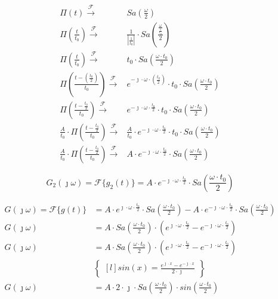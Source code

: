 \begin{task}
\begin{align*}
\Pi(t) \xrightarrow{\mathcal F} & Sa\left(\frac{\omega}{2}\right)\\
\Pi(\frac{t}{t_{0}}) \xrightarrow{\mathcal F} & \frac{1}{\left|\frac{1}{t_{0}}\right|} \cdot Sa\left(\frac{ \frac{\omega}{ \frac{1}{t_{0}} }}{2}\right)\\
\Pi(\frac{t}{t_{0}}) \xrightarrow{\mathcal F} & t_{0} \cdot Sa\left(\frac{\omega \cdot t_{0}}{2}\right)\\
\Pi(\frac{t-(\frac{t_{0}}{2})}{t_{0}}) \xrightarrow{\mathcal F} & e^{-\jmath \cdot \omega \cdot (\frac{t_{0}}{2})} \cdot t_{0} \cdot Sa\left(\frac{\omega \cdot t_{0}}{2}\right)\\
\Pi(\frac{t-\frac{t_{0}}{2}}{t_{0}}) \xrightarrow{\mathcal F} & e^{-\jmath \cdot \omega \cdot \frac{t_{0}}{2}} \cdot t_{0} \cdot Sa\left(\frac{\omega \cdot t_{0}}{2}\right)\\
\frac{A}{t_{0}} \cdot \Pi(\frac{t-\frac{t_{0}}{2}}{t_{0}}) \xrightarrow{\mathcal F} & \frac{A}{t_{0}} \cdot e^{-\jmath \cdot \omega \cdot \frac{t_{0}}{2}} \cdot t_{0} \cdot Sa\left(\frac{\omega \cdot t_{0}}{2}\right)\\
\frac{A}{t_{0}} \cdot \Pi(\frac{t-\frac{t_{0}}{2}}{t_{0}}) \xrightarrow{\mathcal F} & A \cdot e^{-\jmath \cdot \omega \cdot \frac{t_{0}}{2}} \cdot Sa\left(\frac{\omega \cdot t_{0}}{2}\right)
\end{align*}

\begin{equation}
G_{2}(\jmath \omega) = \mathcal F\{g_{2}(t)\} = A \cdot e^{-\jmath \cdot \omega \cdot \frac{t_{0}}{2}} \cdot Sa\left(\frac{\omega \cdot t_{0}}{2}\right)
\end{equation}

\begin{align*}
G(\jmath \omega) = \mathcal F\{g(t)\} &= A \cdot e^{\jmath \cdot \omega \cdot \frac{t_{0}}{2}} \cdot Sa\left(\frac{\omega \cdot t_{0}}{2}\right) - A \cdot  e^{-\jmath \cdot \omega \cdot \frac{t_{0}}{2}} \cdot Sa\left(\frac{\omega \cdot t_{0}}{2}\right)\\
G(\jmath \omega) &= A \cdot Sa\left(\frac{\omega \cdot t_{0}}{2}\right) \cdot \left(e^{\jmath \cdot \omega \cdot \frac{t_{0}}{2}} - e^{-\jmath \cdot \omega \cdot \frac{t_{0}}{2}}\right)\\
G(\jmath \omega) &= A \cdot Sa\left(\frac{\omega \cdot t_{0}}{2}\right) \cdot \left(e^{\jmath \cdot \omega \cdot \frac{t_{0}}{2}} - e^{-\jmath \cdot \omega \cdot \frac{t_{0}}{2}}\right)\\
&\begin{Bmatrix*}[l]
sin(x)=\frac{e^{\jmath \cdot x} - e^{-\jmath \cdot x}}{2 \cdot \jmath}
\end{Bmatrix*}\\
G(\jmath \omega) &= A \cdot 2 \cdot \jmath \cdot Sa\left(\frac{\omega \cdot t_{0}}{2}\right) \cdot sin\left(\frac{\omega \cdot t_{0}}{2}\right)\\
\end{align*}


\end{task}
